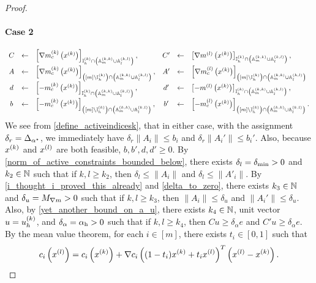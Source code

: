 \begin{proof}
\paragraph*{Case 2}
\begin{align*}
\begin{array}{cclccl}
C  &\gets& \left[\nabla m^{(k)}_c\left(x^{(k)}\right)\right]_{{ \mathbb I_h^{(k)} } \cap \left({\mathbb A_m^{(k, k)}} \cup {\mathbb A_l^{(k, l)}} \right)}, &
C' &\gets& \left[\nabla m^{(l)}\left(x^{(k)}\right)\right]_{{ \mathbb I_h^{(k)} } \cap \left({\mathbb A_m^{(k, k)}} \cup {\mathbb A_l^{(k, l)}} \right)}, \\
A  &\gets& \left[\nabla m^{(k)}_c\left(x^{(k)}\right)\right]_{\left([m] \setminus { \mathbb I_h^{(k)} }\right) \cap \left({\mathbb A_m^{(k, k)}} \cup {\mathbb A_l^{(k, l)}} \right)}, &
A' &\gets& \left[\nabla m^{(l)}_c\left(x^{(k)}\right)\right]_{\left([m] \setminus { \mathbb I_h^{(k)} }\right) \cap \left({\mathbb A_m^{(k, k)}} \cup {\mathbb A_l^{(k, l)}} \right)} \\
d  &\gets& \left[-m^{(k)}_c\left(x^{(k)}\right)\right]_{{ \mathbb I_h^{(k)} } \cap \left({\mathbb A_m^{(k, k)}} \cup {\mathbb A_l^{(k, l)}} \right)}, &
d' &\gets& \left[-m^{(l)}\left(x^{(k)}\right)\right]_{{ \mathbb I_h^{(k)} } \cap \left({\mathbb A_m^{(k, k)}} \cup {\mathbb A_l^{(k, l)}} \right)}, \\
b  &\gets& \left[-m^{(k)}_c\left(x^{(k)}\right)\right]_{\left([m] \setminus { \mathbb I_h^{(k)} }\right) \cap \left({\mathbb A_m^{(k, k)}} \cup {\mathbb A_l^{(k, l)}} \right)}, &
b' &\gets& \left[-m^{(l)}_c\left(x^{(k)}\right)\right]_{\left([m] \setminus { \mathbb I_h^{(k)} }\right) \cap \left({\mathbb A_m^{(k, k)}} \cup {\mathbb A_l^{(k, l)}} \right)}.
\end{array}
\end{align*}
We see from \cref{define_activeindicesk}, that in either case, with the assignment $\delta_r = {\Delta_{\alpha^{\star}}}$, we immediately have 
$\delta_r \|A_i\| \le b_i$ and $\delta_r \|A_i'\| \le b_i'$.
Also, because $x^{(k)}$ and ${x^{(l)}}$ are both feasible, $b, b', d, d' \ge 0$.
By \cref{norm_of_active_constraints_bounded_below}, there exists $\delta_l = {\delta_{\textrm{min}}} > 0$ and $k_2 \in \mathbb N$ such that if $k, l \ge k_2$, then
$\delta_l \le \|A_i\|$ and $\delta_l \le \|A'_i\|$.
By \cref{i_thought_i_proved_this_already} and \cref{delta_to_zero}, there exists $k_3 \in \mathbb N$ and $\delta_u = {M_{\nabla m}} > 0$ such that if $k, l \ge k_3$,
then
$\|A_i\| \le \delta_u$ and $\|A_i'\| \le \delta_u$.
Also, by \cref{yet_another_bound_on_a_u}, there exists $k_4 \in \mathbb N$, unit vector $u = { u_{h}^{(k)} }$, and $\delta_{\alpha} = { \alpha_{\textrm{h}} } > 0$ 
such that if $k, l \ge k_4$, then
$Cu \ge \delta_{\alpha} e$ and $C'u \ge \delta_{\alpha} e$.
By the mean value theorem, for each $i \in [m]$, there exists $t_i \in [0, 1]$ such that
\begin{align*}
c_i\left(\xl\right) = c_i\left(\xk\right) + \nabla c_i\left((1 - t_i)\xk + t_i \xl\right)^T\left(\xl - \xk\right).

\end{align*}
\end{proof}
